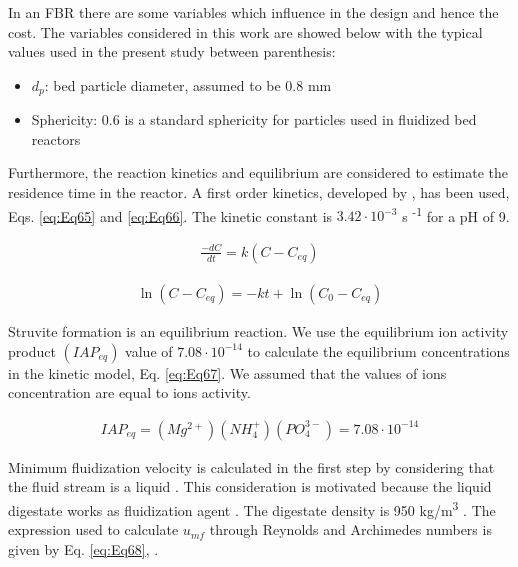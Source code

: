 \begin{refsection}[referencesCh2]
In an FBR there are some variables which influence in the design and hence the cost. The variables considered in this work are showed below with the typical values used in the present study between parenthesis:

\begin{itemize}
	\item $d_p$: bed particle diameter, assumed to be 0.8 mm \citep{jordaan2011development}
	\item Sphericity: 0.6 is a standard sphericity for particles used in fluidized bed reactors \citep{Fogler2005Elements}
\end{itemize}

Furthermore, the reaction kinetics and equilibrium are considered to estimate the residence time in the reactor. A first order kinetics, developed by \citet{nelson2003struvite}, has been used, Eqs. \ref{eq:Eq65} and \ref{eq:Eq66}. The kinetic constant is $3.42 \cdot 10^{-3}$ s \textsuperscript{-1} for a pH of 9.

\begin{align}
	\frac{{-dC}}{{dt}} = k \left({C - {C_{eq}}} \right) \label{eq:Eq65}
\end{align}

\begin{align}
	\ln \left( {C - {C_{eq}}} \right) =  - kt + \ln \left( {{C_0} - {C_{eq}}} \right) \label{eq:Eq66}
\end{align}

Struvite formation is an equilibrium reaction. We use the equilibrium ion activity product $\left(IAP_{eq}\right)$ value of $7.08 \cdot 10^{-14}$ \citep{nelson2003struvite} to calculate the equilibrium concentrations in the kinetic model, Eq. \ref{eq:Eq67}. We assumed that the values of ions concentration are equal to ions activity.

\begin{align}
	IAP_{eq} = \left( {Mg^{2+}} \right)\left( NH_4^{+} \right)\left( {PO_4^{3-}} \right) = 7.08 \cdot {10^{ - 14}}  \label{eq:Eq67}
\end{align}

Minimum fluidization velocity is calculated in the first step by considering that the fluid stream is a liquid \citep{mangin2004fluid}. This consideration is motivated because the liquid digestate works as fluidization agent \citep{le2006understanding}. The digestate density is 950 kg/m\textsuperscript{3} \citep{rigby2011new}. The expression used to calculate $u_{mf}$ through Reynolds and Archimedes numbers is given by Eq. \ref{eq:Eq68}, \citep{tisa2014basic}.


\end{refsection}
